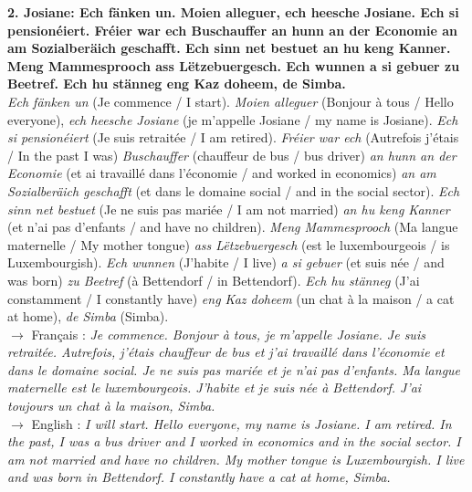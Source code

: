 \noindent\textbf{2. Josiane: Ech fänken un. Moien alleguer, ech heesche Josiane. Ech si pensionéiert. Fréier war ech Buschauffer an hunn an der Economie an am Sozialberäich geschafft. Ech sinn net bestuet an hu keng Kanner. Meng Mammesprooch ass Lëtzebuergesch. Ech wunnen a si gebuer zu Beetref. Ech hu stänneg eng Kaz doheem, de Simba.}\\
\textit{Ech fänken un} (Je commence / I start). \textit{Moien alleguer} (Bonjour à tous / Hello everyone), \textit{ech heesche Josiane} (je m'appelle Josiane / my name is Josiane). \textit{Ech si pensionéiert} (Je suis retraitée / I am retired). \textit{Fréier war ech} (Autrefois j'étais / In the past I was) \textit{Buschauffer} (chauffeur de bus / bus driver) \textit{an hunn an der Economie} (et ai travaillé dans l'économie / and worked in economics) \textit{an am Sozialberäich geschafft} (et dans le domaine social / and in the social sector). \textit{Ech sinn net bestuet} (Je ne suis pas mariée / I am not married) \textit{an hu keng Kanner} (et n'ai pas d'enfants / and have no children). \textit{Meng Mammesprooch} (Ma langue maternelle / My mother tongue) \textit{ass Lëtzebuergesch} (est le luxembourgeois / is Luxembourgish). \textit{Ech wunnen} (J'habite / I live) \textit{a si gebuer} (et suis née / and was born) \textit{zu Beetref} (à Bettendorf / in Bettendorf). \textit{Ech hu stänneg} (J'ai constamment / I constantly have) \textit{eng Kaz doheem} (un chat à la maison / a cat at home), \textit{de Simba} (Simba).\\
$\rightarrow$ Français : \textit{Je commence. Bonjour à tous, je m'appelle Josiane. Je suis retraitée. Autrefois, j'étais chauffeur de bus et j'ai travaillé dans l'économie et dans le domaine social. Je ne suis pas mariée et je n'ai pas d'enfants. Ma langue maternelle est le luxembourgeois. J'habite et je suis née à Bettendorf. J'ai toujours un chat à la maison, Simba.}\\
$\rightarrow$ English : \textit{I will start. Hello everyone, my name is Josiane. I am retired. In the past, I was a bus driver and I worked in economics and in the social sector. I am not married and have no children. My mother tongue is Luxembourgish. I live and was born in Bettendorf. I constantly have a cat at home, Simba.}\\[0.5em]

